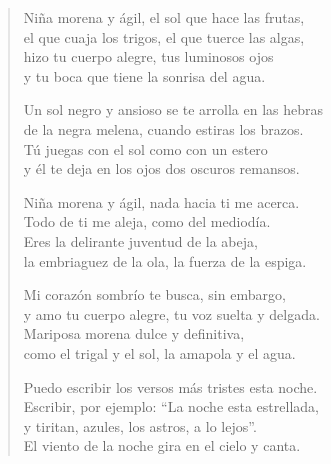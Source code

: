 \documentclass[12pt]{article}
\begin{document}
\clearpage
{}
\begin{verse}

Niña morena y ágil, el sol que hace las frutas,\\
el que cuaja los trigos, el que tuerce las algas,\\
hizo tu cuerpo alegre, tus luminosos ojos\\
y tu boca que tiene la sonrisa del agua.  

Un sol negro y ansioso se te arrolla en las hebras\\
de la negra melena, cuando estiras los brazos.\\
Tú juegas con el sol como con un estero\\
y él te deja en los ojos dos oscuros remansos.  

Niña morena y ágil, nada hacia ti me acerca.\\
Todo de ti me aleja, como del mediodía.\\
Eres la delirante juventud de la abeja,\\
la embriaguez de la ola, la fuerza de la espiga.  

Mi corazón sombrío te busca, sin embargo,\\
y amo tu cuerpo alegre, tu voz suelta y delgada.\\
Mariposa morena dulce y definitiva,\\
como el trigal y el sol, la amapola y el agua.  

Puedo escribir los versos más tristes esta noche.\\
Escribir, por ejemplo: ``La noche esta estrellada,\\
y tiritan, azules, los astros, a lo lejos''.\\
El viento de la noche gira en el cielo y canta.

\end{verse}
\end{document}
